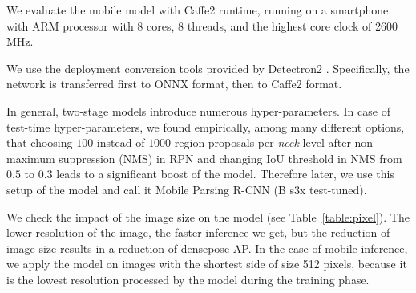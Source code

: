 \begin{table}[t!]
\centering
{}
\caption{The impact of number of people in the frame on performance characteristics. Results are obtained with Mobile Parsing R-CNN (B s3x, test-tuned) on DensePose-COCO \textit{minival}. The shortest image side is 512 pixels}
\label{table:people}
\end{table}

We evaluate the mobile model with Caffe2 runtime, running on a smartphone with ARM processor with 8 cores, 8 threads, and the highest core clock of 2600 MHz.

We use the deployment conversion tools provided by Detectron2 \cite{detectron2}. Specifically, the network is transferred first to ONNX format, then to Caffe2 format.

In general, two-stage models introduce numerous hyper-parameters. In case of test-time hyper-parameters, we found empirically, among many different options, that choosing $100$ instead of $1000$ region proposals per \textit{neck} level after non-maximum suppression (NMS) in RPN and changing IoU threshold in NMS from $0.5$ to $0.3$ leads to a significant boost of the model. Therefore later, we use this setup of the model and call it Mobile Parsing R-CNN (B s3x test-tuned).

We check the impact of the image size on the model (see Table~\ref{table:pixel}). The lower resolution of the image, the faster inference we get, but the reduction of image size results in a reduction of densepose AP. In the case of mobile inference, we apply the model on images with the shortest side of size 512 pixels, because it is the lowest resolution processed by the model during the training phase.


